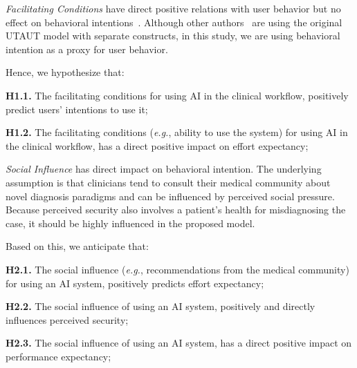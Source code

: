 {\it Facilitating Conditions} have direct positive relations with user behavior but no effect on behavioral intentions~\cite{CALISTO2022102922}.
Although other authors~\cite{KHALILZADEH2017460} are using the original \ac{UTAUT} model with separate constructs, in this study, we are using behavioral intention as a proxy for user behavior.

\vspace{2.00mm}

\noindent
Hence, we hypothesize that:

\vspace{2.00mm}

\noindent
{\bf H1.1.} The facilitating conditions for using \ac{AI} in the clinical workflow, positively predict users' intentions to use it;

\vspace{2.00mm}

\noindent
{\bf H1.2.} The facilitating conditions ({\it e.g.}, ability to use the system) for using \ac{AI} in the clinical workflow, has a direct positive impact on effort expectancy;

\vspace{2.00mm}

{\it Social Influence} has direct impact on behavioral intention.
The underlying assumption is that clinicians tend to consult their medical community about novel diagnosis paradigms and can be influenced by perceived social pressure.
Because perceived security also involves a patient's health for misdiagnosing the case, it should be highly influenced in the proposed model.

\noindent
Based on this, we anticipate that:

\vspace{2.00mm}

\noindent
{\bf H2.1.} The social influence ({\it e.g.}, recommendations from the medical community) for using an \ac{AI} system, positively predicts effort expectancy;

\vspace{2.00mm}

\noindent
{\bf H2.2.} The social influence of using an \ac{AI} system, positively and directly influences perceived security;

\vspace{2.00mm}

\noindent
{\bf H2.3.} The social influence of using an \ac{AI} system, has a direct positive impact on performance expectancy;

\vspace{2.00mm}

